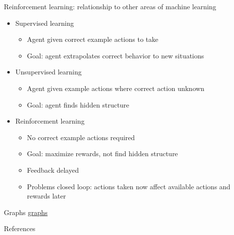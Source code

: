 \documentclass[handout]{beamer}
\begin{document}
\begin{frame}[c]{Reinforcement learning: relationship to other areas of machine learning}
\begin{itemize}%
  \item Supervised learning
  \begin{itemize}
    \item Agent given correct example actions to take
    \item Goal: agent extrapolates correct behavior to new situations
  \end{itemize}
  \item Unsupervised learning
  \begin{itemize}
    \item Agent given example actions where correct action unknown
    \item Goal: agent finds hidden structure
  \end{itemize}
  \item Reinforcement learning
\begin{itemize}
  \item No correct example actions required
  \item Goal: maximize rewards, not find hidden structure
  \item Feedback delayed
  \item Problems closed loop: actions taken now affect available actions and rewards later
\end{itemize}
\end{itemize}
\end{frame}

\begin{frame}[c]{Graphs}
  \href{https://www.desmos.com/calculator/bhofs34c6k}{graphs}
\end{frame}


\begin{frame}[allowframebreaks]{References}

\printbibliography[heading=none]

\end{frame}
\end{document}
